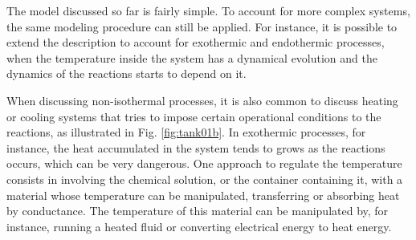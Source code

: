 \documentclass[a4paper,11pt]{book}
\numberwithin{figure}{chapter}
\numberwithin{equation}{chapter}
\numberwithin{table}{chapter}
\theoremstyle{definition}
\begin{document}
The model discussed so far is fairly simple. To account for more complex systems, the same modeling procedure can still be applied. For instance, it is possible to extend the description to account for exothermic and endothermic processes, when the temperature inside the system has a dynamical evolution and the dynamics of the reactions starts to depend on it.

When discussing non-isothermal processes, it is also common to discuss heating or cooling systems that tries to impose certain operational conditions to the reactions, as illustrated in Fig. \ref{fig:tank01b}. In exothermic processes, for instance, the heat accumulated in the system tends to grows as the reactions occurs, which can be very dangerous. One approach to regulate the temperature consists in involving the chemical solution, or the container containing it, with a material whose temperature can be manipulated, transferring or absorbing heat by conductance. The temperature of this material can be manipulated by, for instance, running a heated fluid or converting electrical energy to heat energy.
\end{document}
